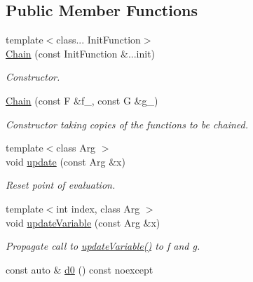 \subsection*{Public Member Functions}
\begin{DoxyCompactItemize}
\item 
{\footnotesize template$<$class... Init\-Function$>$ }\\\hyperlink{structFunG_1_1MathematicalOperations_1_1Chain_a11bbc19be4ace14904de0be6d703fb1f}{Chain} (const Init\-Function \&...init)
\begin{DoxyCompactList}\small\item\em Constructor. \end{DoxyCompactList}\item 
\hyperlink{structFunG_1_1MathematicalOperations_1_1Chain_a3167b6304026eb0bd92e57d0dd0087e0}{Chain} (const F \&f\-\_\-, const G \&g\-\_\-)
\begin{DoxyCompactList}\small\item\em Constructor taking copies of the functions to be chained. \end{DoxyCompactList}\item 
\hypertarget{structFunG_1_1MathematicalOperations_1_1Chain_adb7f63859ef7dbdd08b0908c3a17794d}{{\footnotesize template$<$class Arg $>$ }\\void \hyperlink{structFunG_1_1MathematicalOperations_1_1Chain_adb7f63859ef7dbdd08b0908c3a17794d}{update} (const Arg \&x)}\label{structFunG_1_1MathematicalOperations_1_1Chain_adb7f63859ef7dbdd08b0908c3a17794d}

\begin{DoxyCompactList}\small\item\em Reset point of evaluation. \end{DoxyCompactList}\item 
\hypertarget{structFunG_1_1MathematicalOperations_1_1Chain_adf372d1f3b00903528740f3da6820b77}{{\footnotesize template$<$int index, class Arg $>$ }\\void \hyperlink{structFunG_1_1MathematicalOperations_1_1Chain_adf372d1f3b00903528740f3da6820b77}{update\-Variable} (const Arg \&x)}\label{structFunG_1_1MathematicalOperations_1_1Chain_adf372d1f3b00903528740f3da6820b77}

\begin{DoxyCompactList}\small\item\em Propagate call to \hyperlink{structFunG_1_1MathematicalOperations_1_1Chain_adf372d1f3b00903528740f3da6820b77}{update\-Variable()} to f and g. \end{DoxyCompactList}\item 
\hypertarget{structFunG_1_1MathematicalOperations_1_1Chain_abaced47a1bdc62dd6625caed1d11134c}{const auto \& \hyperlink{structFunG_1_1MathematicalOperations_1_1Chain_abaced47a1bdc62dd6625caed1d11134c}{d0} () const noexcept}\label{structFunG_1_1MathematicalOperations_1_1Chain_abaced47a1bdc62dd6625caed1d11134c}


\end{DoxyCompactItemize}
